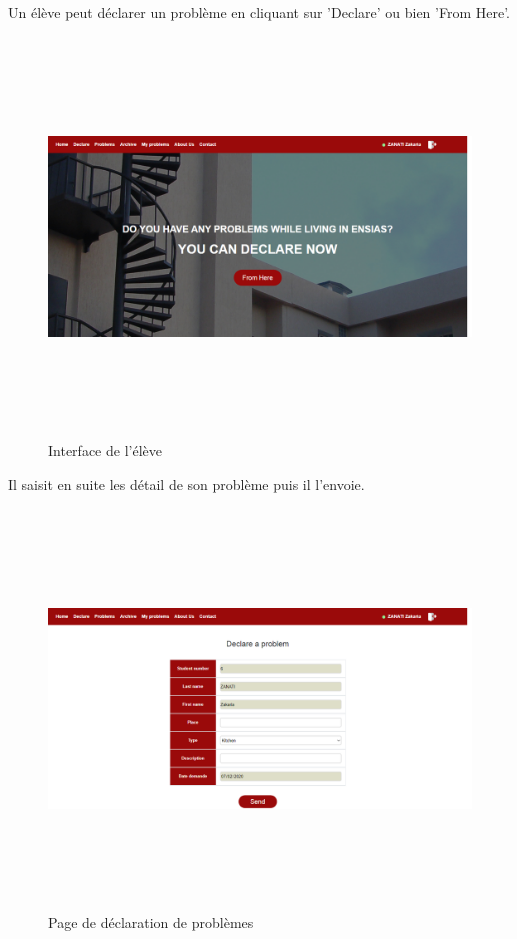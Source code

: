 \documentclass[11.5pt]{report}
\begin{document}
Un élève peut déclarer un problème en cliquant sur 'Declare' ou bien 'From Here'.\\
\begin{figure}[h]
	
	\begin{center}
		\includegraphics[width=500pt,height=300pt]{home-eleve.png} 
		\caption{Interface de l'élève}
	\end{center}
	
\end{figure}
\newpage
Il saisit en suite les détail de son problème puis il l'envoie.\\
\begin{figure}[h]
	
	\begin{center}
		\includegraphics[width=500pt,height=300pt]{declare.png} 
		\caption{Page de déclaration de problèmes}
	\end{center}
	
\end{figure}
\end{document}
